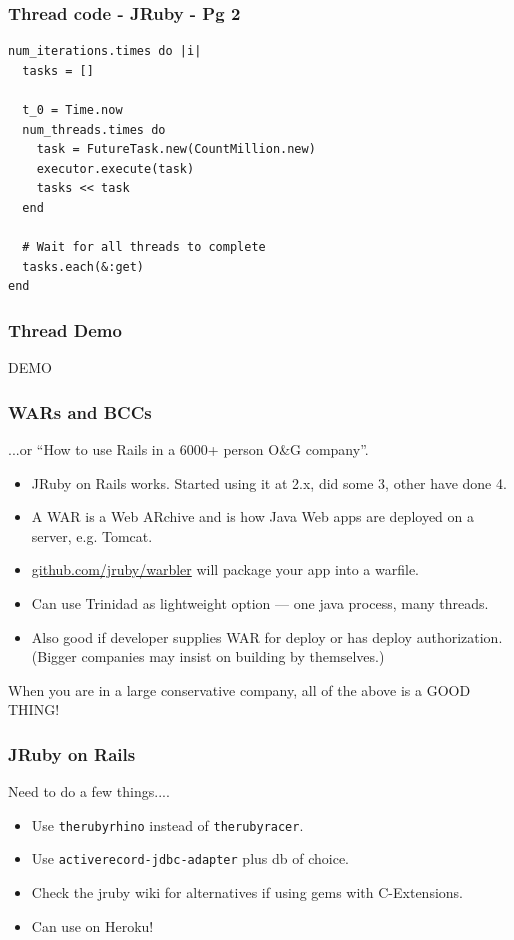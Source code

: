 \begin{frame}[fragile]\frametitle{Thread code - JRuby - Pg 2}
\begin{lstlisting}
num_iterations.times do |i|
  tasks = []

  t_0 = Time.now
  num_threads.times do
    task = FutureTask.new(CountMillion.new)
    executor.execute(task)
    tasks << task
  end

  # Wait for all threads to complete
  tasks.each(&:get)
end
\end{lstlisting}
\end{frame}
\begin{frame}\frametitle{Thread Demo}
  \begin{center}
  {\Huge DEMO}
  \end{center}
\end{frame}
\begin{frame}\frametitle{WARs and BCCs}
  ...or ``How to use Rails in a 6000+ person O\&G company''.
  \begin{itemize}
    \item JRuby on Rails works. Started using it at 2.x, did some 3, other have done 4.
    \item A WAR is a Web ARchive and is how Java Web apps are deployed on a server, e.g. Tomcat.
    \item \url{github.com/jruby/warbler} will package your app into a warfile.
    \item Can use Trinidad as lightweight option --- one java process, many threads.
    \item Also good if developer supplies WAR for deploy or has deploy authorization. (Bigger
          companies may insist on building by themselves.)
  \end{itemize}
  When you are in a large conservative company, all of the above is a GOOD THING!
\end{frame}
\begin{frame}\frametitle{JRuby on Rails}
  Need to do a few things....
  \begin{itemize}
    \item Use \texttt{therubyrhino} instead of \texttt{therubyracer}.
    \item Use \texttt{activerecord-jdbc-adapter} plus db of choice.
    \item Check the jruby wiki for alternatives if using gems with C-Extensions.
    \item Can use on Heroku!
  \end{itemize}
\end{frame}
